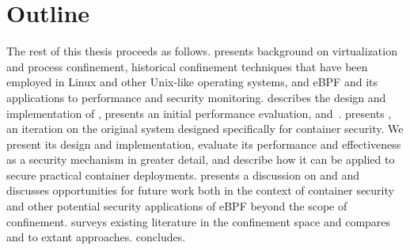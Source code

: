 \section{Outline}%
\label{s:outline}

The rest of this thesis proceeds as follows.  presents background on
virtualization and process confinement, historical confinement techniques that have been
employed in Linux and other Unix-like operating systems, and eBPF and its applications to
performance and security monitoring.  describes the design and
implementation of \bpfbox, presents an initial performance evaluation, and~. 
presents \bpfcontain, an iteration on the original \bpfbox{} system designed
specifically for container security. We present its design and implementation, evaluate
its performance and effectiveness as a security mechanism in greater detail, and describe
how it can be applied to secure practical container deployments. 
presents a discussion on \bpfbox{} and \bpfcontain{} and discusses opportunities for
future work both in the context of container security and other potential security
applications of eBPF beyond the scope of confinement.  surveys existing
literature in the confinement space and compares \bpfbox{} and \bpfcontain{} to extant
approaches.  concludes.
